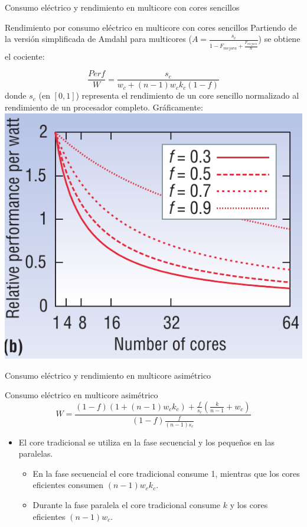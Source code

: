 \documentclass[utf8]{beamer}
\begin{document}
\begin{frame}{Consumo eléctrico y rendimiento en multicore con cores sencillos}
    \begin{block}{Rendimiento por consumo eléctrico en multicore con cores sencillos}
    Partiendo de la versión simplificada de Amdahl para multicores ($ A = \frac{s_{c}}{1 - F_{mejora} + \frac{F_{mejora}}{n}} $) se obtiene el cociente:
    
        $$ \frac{Perf}{W} = \frac{s_{c}}{w_{c} + (n - 1)w_{c}k_{c}(1-f)} $$
    donde $ s_{c} $ (en $ [0,1] $) representa el rendimiento de un core sencillo normalizado al rendimiento de un procesador completo. Gráficamente:    
    \center\includegraphics[width=.25\linewidth]{figures/am_powperf_b}
    
    \end{block}    
    
\end{frame}


\begin{frame}{Consumo eléctrico y rendimiento en multicore asimétrico}
    \begin{block}{Consumo eléctrico en multicore asimétrico}
        $$ W = \frac{(1 -f)(1+(n-1)w_{c}k_{c}) + \frac{f}{s_{c}} (\frac{k}{n-1} + w_{c})}{(1 - f)\frac{f}{(n-1)s_{c}}} $$
        \begin{itemize}
             \item El core tradicional se utiliza en la fase secuencial y los pequeños en las paralelas.
             \begin{itemize}
                \item En la fase secuencial el core tradicional consume 1, mientras que los cores eficientes consumen $ (n-1)w_{c}k_{c} $.
                \item Durante la fase paralela el core tradicional consume $ k $ y los cores eficientes $ (n-1)w_{c} $.
             \end{itemize}
        \end{itemize}
          
    
    \end{block}
    
    
\end{frame}
\end{document}
